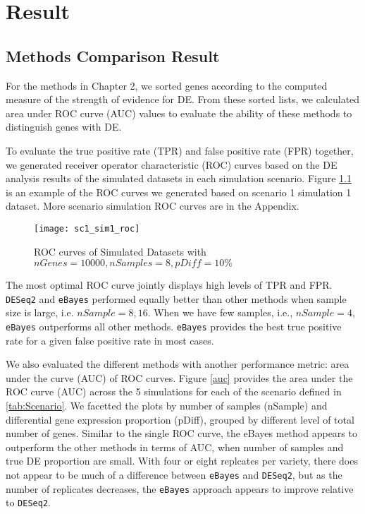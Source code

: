 \chapter{Result}

\section{Methods Comparison Result}

For the methods in Chapter 2, we sorted genes according to the computed measure of the strength of evidence for DE. From these sorted lists, we calculated area under ROC curve (AUC) values to evaluate the ability of these methods to distinguish genes with DE. 

To evaluate the true positive rate (TPR) and false positive rate (FPR) together, we generated receiver operator characteristic (ROC) curves based on the DE analysis results of the simulated datasets in each simulation scenario. Figure \ref{sc1_roc_01} is an example of the ROC curves we generated based on scenario 1 simulation 1 dataset. More scenario simulation ROC curves are in the Appendix. 

\begin{figure}[h!tb] 
\texttt{[image: sc1\_sim1\_roc]}
\caption{ROC curves of Simulated Datasets with $nGenes=10000, nSamples=8, pDiff=10\%$}
\label{sc1_roc_01}
\end{figure}

The most optimal ROC curve jointly displays high levels of TPR and FPR. {\tt DESeq2} and {\tt eBayes} performed equally better than other methods when sample size is large, i.e. $nSample = 8, 16$. When we have few samples, i.e., $nSample=4$, {\tt eBayes} outperforms all other methods. {\tt eBayes} provides the best true positive rate for a given false positive rate in most cases. 

We also evaluated the different methods with another performance metric: area under the curve (AUC) of ROC curves. Figure \ref{auc} provides the area under the ROC curve (AUC) across the 5 simulations for each of the scenario defined in \ref{tab:Scenario}. We facetted the plots by number of samples (nSample) and differential gene expression proportion (pDiff), grouped by different level of total number of genes. Similar to the single ROC curve, the eBayes method appears to outperform the other methods in terms of AUC, when number of samples and true DE proportion are small. With four or eight replcates per variety, there does not appear to be much of a difference between {\tt eBayes} and {\tt DESeq2}, but as the number of replicates decreases, the {\tt eBayes} approach appears to improve relative to {\tt DESeq2}.


